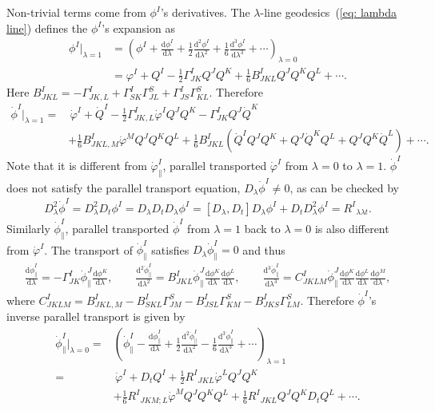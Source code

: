 \documentclass[aps, prd
, preprint
, nofootinbib 
, longbibliography
]{revtex4-1}
\newcommand{\dif}[2]{\frac{\mathrm{d} #1}{\mathrm{d} #2}}
\newcommand{\bae}[1]{\begin{align} #1 \end{align}}
\begin{document}
Non-trivial terms come from $\phi^I$'s derivatives. The $\lambda$-line geodesics~(\ref{eq: lambda line}) defines the $\phi^I$'s expansion as
\bae{
    \phi^I|_{\lambda=1}&=\left(\phi^I+\dif{\phi^I}{\lambda}+\frac{1}{2}\dif{^2\phi^I}{\lambda^2}+\frac{1}{6}\dif{^3\phi^I}{\lambda^3}+\cdots\right)_{\lambda=0} \nonumber \\
    &=\varphi^I+Q^I-\frac{1}{2}\Gamma^I_{JK}Q^JQ^K+\frac{1}{6}B^I_{JKL}Q^JQ^KQ^L+\cdots.
}
Here $B^I_{JKL}=-\Gamma^I_{JK,L}+\Gamma^I_{SK}\Gamma^S_{JL}+\Gamma^I_{JS}\Gamma^S_{KL}$. Therefore
\bae{
    \dot{\phi}^I|_{\lambda=1}=&\,\dot{\varphi}^I+\dot{Q}^I-\frac{1}{2}\Gamma^I_{JK,L}\dot{\varphi}^IQ^JQ^K-\Gamma^I_{JK}Q^J\dot{Q}^K \nonumber \\
    &+\frac{1}{6}B^I_{JKL,M}\dot{\varphi}^MQ^JQ^KQ^L+\frac{1}{6}B^I_{JKL}(\dot{Q}^IQ^JQ^K+Q^J\dot{Q}^KQ^L+Q^JQ^K\dot{Q}^L)+\cdots.
}
Note that it is different from $\dot{\varphi}^I_\parallel$, parallel transported $\dot{\varphi}^I$ from $\lambda=0$ to $\lambda=1$. $\dot{\phi}^I$ does not satisfy the parallel transport equation, $D_\lambda\dot{\phi}^I\neq0$, as can be checked by
\bae{
    D_\lambda^2\dot{\phi}^I=D_\lambda^2D_t\phi^I=D_\lambda D_tD_\lambda\phi^I=[D_\lambda,D_t]D_\lambda\phi^I+D_tD_\lambda^2\phi^I=R^I{}_{\lambda\lambda t}.
}
Similarly $\dot{\phi}^I_\parallel$, parallel transported $\dot{\phi}^I$ from $\lambda=1$ back to $\lambda=0$ is also different from $\dot{\varphi}^I$. The transport of $\dot{\phi}^I_\parallel$ satisfies $D_\lambda\dot{\phi}^I_\parallel=0$ and thus
\bae{
    \dif{\dot{\phi}^I_\parallel}{\lambda}=-\Gamma^I_{JK}\dot{\phi}^J_\parallel\dif{\phi^K}{\lambda}, \qquad \dif{^2\dot{\phi}^I_\parallel}{\lambda^2}=B^I_{JKL}\dot{\phi}^J_\parallel\dif{\phi^K}{\lambda}\dif{\phi^L}{\lambda}, \qquad \dif{^3\dot{\phi}^I_\parallel}{\lambda^3}=C^I_{JKLM}\dot{\phi}^J_\parallel\dif{\phi^K}{\lambda}\dif{\phi^L}{\lambda}\dif{\phi^M}{\lambda},
}
where $C^I_{JKLM}=B^I_{JKL,M}-B^I_{SKL}\Gamma^S_{JM}-B^I_{JSL}\Gamma^S_{KM}-B^I_{JKS}\Gamma^S_{LM}$. Therefore $\dot{\phi}^I$'s inverse parallel transport is given by
\bae{\label{eq: expansion of dotphi parallel}
    \dot{\phi}^I_\parallel|_{\lambda=0}=&\left(\dot{\phi}^I_\parallel-\dif{\dot{\phi}^I_\parallel}{\lambda}+\frac{1}{2}\dif{^2\dot{\phi}^I_\parallel}{\lambda^2}-\frac{1}{6}\dif{^3\dot{\phi}^I_\parallel}{\lambda^3}+\cdots\right)_{\lambda=1} \nonumber \\
    =&\,\dot{\varphi}^I+D_tQ^I+\frac{1}{2}R^I{}_{JKL}\dot{\varphi}^LQ^JQ^K \nonumber \\
    &+\frac{1}{6}R^I{}_{JKM;L}\dot{\varphi}^MQ^JQ^KQ^L+\frac{1}{6}R^I{}_{JKL}Q^JQ^KD_tQ^L+\cdots. 
}
\end{document}
